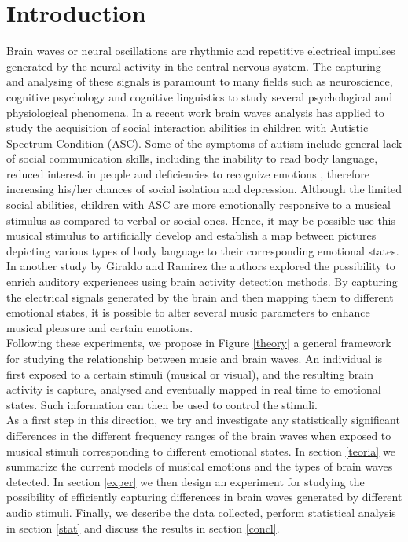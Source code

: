 \documentclass[twocolumn,superscriptaddress]{revtex4-1}
\theoremstyle{definition}
\theoremstyle{remark}
\begin{document}
\section{Introduction}
Brain waves or neural oscillations are rhythmic and repetitive electrical impulses generated by the neural activity in the central nervous system. The capturing and analysing of these signals is paramount to many fields such as neuroscience, cognitive psychology and cognitive linguistics to study several psychological and physiological phenomena. In a recent work \cite{asc} brain waves analysis has applied to study the acquisition of social interaction abilities in children with Autistic Spectrum Condition (ASC). Some of the symptoms of autism include general lack of social communication skills, including the inability to read body language, reduced interest in people and deficiencies to recognize emotions \cite{aut}, therefore increasing his/her chances of social isolation and depression. Although the limited social abilities, children with ASC are more emotionally responsive to a musical stimulus as compared to verbal or social ones. Hence, it may be possible use this musical stimulus to artificially develop and establish a map between pictures depicting various types of body language to their corresponding emotional states. \\
In another study by Giraldo and Ramirez \cite{activelistening} the authors explored the possibility to enrich auditory experiences using brain activity detection methods. By capturing the electrical signals generated by the brain and then mapping them to different emotional states, it is possible to alter several music parameters to enhance musical pleasure and certain emotions.\\
Following these experiments, we propose in Figure \ref{theory} a general framework for studying the relationship between music and brain waves. An individual is first exposed to a certain stimuli (musical or visual), and the resulting brain activity is capture, analysed and eventually mapped in real time to emotional states. Such information can then be used to control the stimuli.\\
As a first step in this direction, we try and investigate any statistically significant differences in the different frequency ranges of the brain waves when exposed to musical stimuli corresponding to different emotional states. In section \ref{teoria} we summarize the current models of musical emotions and the types of brain waves detected. In section \ref{exper} we then design an experiment for studying the possibility of efficiently capturing differences in brain waves generated by different audio stimuli. Finally, we describe the data collected, perform statistical analysis in section \ref{stat} and discuss the results in section \ref{concl}.
\end{document}

